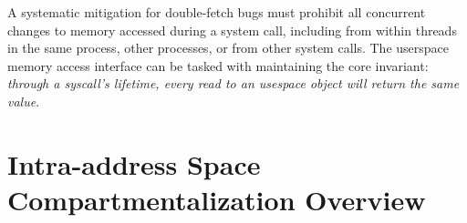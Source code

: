 A systematic mitigation for double-fetch bugs must prohibit all concurrent
changes to memory accessed during a system call, including from within
threads in the same process, other processes, or from other system calls.
The userspace memory access interface can be tasked with maintaining
the core invariant: 
\emph{through a syscall's lifetime, every read to an usespace object
will return the same value}.


\section{Intra-address Space Compartmentalization Overview}

